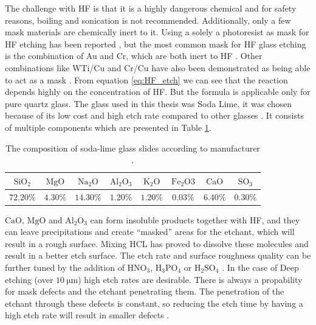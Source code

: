 \documentclass[final]{jyflluk}
\begin{document}
The challenge with HF is that it is a highly dangerous chemical and for safety reasons, boiling and sonication is not recommended. Additionally, only a few mask materials are chemically inert to it.  Using a solely a photoresist as mask for HF etching has been reported \cite{lin2001fast,guanglong2012microfluidic}, but the most common mask for HF glass etching is the combination of Au and Cr, which are both inert to HF \cite{iliescu2005characterization,tay2006defect}. Other combinations like WTi/Cu and Cr/Cu have also been demonstrated as being able to act as a mask \cite{Hgglund2013CharacterizationOM,iliescu2008wet}.
From equation \ref{eq:HF_etch} we can see that the reaction depends highly on the concentration of HF. But the formula is applicable only for pure quartz glass. The glass used in this thesis was Soda Lime, it was chosen because of its low cost and high etch rate compared to other glasses \cite{srivannavit2004design}. It consists of multiple components which are presented in Table \ref{tab:soda_lime}. 
\begin{table}[h]
    \centering
    \caption{The composition of soda-lime glass slides according to manufacturer \cite{Soda_lime_ONLINE}.}
    \label{tab:soda_lime}
    \begin{tabular}{cccccccc} \toprule
       $\mathrm{SiO_2}$  & $\mathrm{MgO}$   &  $\mathrm{Na_2 O}$ & $\mathrm{Al_2 O_3}$ &  $\mathrm{K_2 O}$ &  $\mathrm{Fe_2O3}$ &  $\mathrm{CaO}$ & $\mathrm{SO_3}$ \\ \midrule

       $72.20 \percent$  &  $4.30 \percent$ &  $14.30 \percent$  & $1.20 \percent$     &  $1.20 \percent$  & $0.03 \percent$    & $6.40 \percent$ & $0.30 \percent$\\ \bottomrule
    \end{tabular}
\end{table} 
$\mathrm{CaO}$, $\mathrm{MgO}$ and $\mathrm{Al_2 O_3}$ can form insoluble products together with HF, and they can leave precipitations and create “masked” areas for the etchant, which will result in a rough surface. Mixing HCL has proved to dissolve these molecules and result in a better etch surface\cite{iliescu2005characterization}. The etch rate and surface roughness quality can be further tuned by the addition of $\mathrm{HNO_3}$, $\mathrm{H_3 PO_4 }$  or $\mathrm{H_2SO_4}$ \cite{park2017review}. In the case of Deep etching (over $\SI{10}{\micro \metre}$) high etch rates are desirable. There is always a propability for mask defects and the etchant penetrating them. The penetration of the etchant through these defects is constant, so reducing the etch time by having a high etch rate will result in smaller defects \cite{tay2006defect}.
\end{document}
